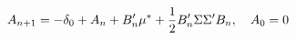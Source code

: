 \begin{equation*}
	A_{n + 1} = - \delta_{0} + A_{n} + B_{n}' \mu^{*} + \frac{1}{2} B_{n}' \Sigma \Sigma' B_{n} , \quad A_{0} = 0
\end{equation*}